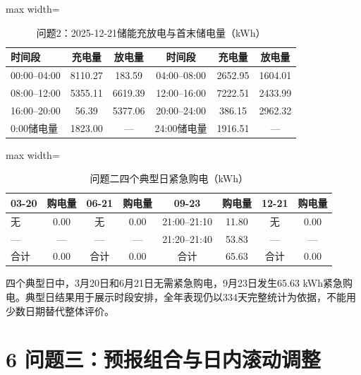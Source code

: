 \documentclass[UTF8,a4paper,zihao=-4,fontset=windows]{ctexart}
\begin{document}
\begin{table}[H]\centering\caption{问题2：2025-12-21储能充放电与首末储电量（kWh）}
\fontsize{9.5}{12}\selectfont\setlength{\tabcolsep}{4pt}\renewcommand{\arraystretch}{1.12}
\begin{adjustbox}{max width=\linewidth}\begin{tabular}{lccccc}\toprule
时间段 & 充电量 & 放电量 & 时间段 & 充电量 & 放电量\\\midrule
00:00–04:00 & 8110.27 & 183.59 & 04:00–08:00 & 2652.95 & 1604.01\\
08:00–12:00 & 5355.11 & 6619.39 & 12:00–16:00 & 7222.51 & 2433.99\\
16:00–20:00 & 56.39 & 5377.06 & 20:00–24:00 & 386.15 & 2962.32\\
0:00储电量 & 1823.00 & — & 24:00储电量 & 1916.51 & —\\
\bottomrule\end{tabular}\end{adjustbox}\end{table}
\begin{table}[H]\centering\caption{问题二四个典型日紧急购电（kWh）}
\fontsize{9.5}{12}\selectfont\setlength{\tabcolsep}{4pt}\renewcommand{\arraystretch}{1.12}
\begin{adjustbox}{max width=\linewidth}\begin{tabular}{lccccccc}\toprule
03-20 & 购电量 & 06-21 & 购电量 & 09-23 & 购电量 & 12-21 & 购电量\\\midrule
无 & 0.00 & 无 & 0.00 & 21:00–21:10 & 11.80 & 无 & 0.00\\
— & — & — & — & 21:20–21:40 & 53.83 & — & —\\
合计 & 0.00 & 合计 & 0.00 & 合计 & 65.63 & 合计 & 0.00\\
\bottomrule\end{tabular}\end{adjustbox}\end{table}
四个典型日中，3月20日和6月21日无需紧急购电，9月23日发生65.63 kWh紧急购电。典型日结果用于展示时段安排，全年表现仍以334天完整统计为依据，不能用少数日期替代整体评价。
\par
\section{6 问题三：预报组合与日内滚动调整}
\end{document}
